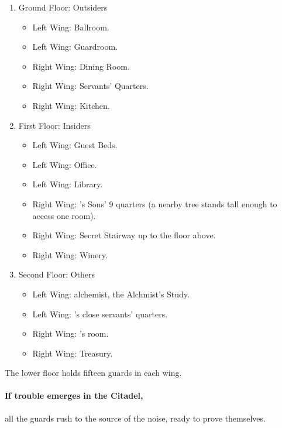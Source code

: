 \begin{enumerate}

  \item{Ground Floor: Outsiders}
    \begin{itemize}
      \item{Left Wing: Ballroom.}
      \item
      Left Wing: Guardroom.
      \item
      Right Wing: Dining Room.
      \item
      Right Wing: Servants' Quarters.
      \item
      Right Wing: Kitchen.
    \end{itemize}
  \item{First Floor: Insiders}
    \begin{itemize}
      \item
      Left Wing: Guest Beds.
      \item
      Left Wing: Office.
      \item
      Left Wing: Library.
      \item
      Right Wing: 's Sons' 9 quarters (a nearby tree stands tall enough to access one room).
      \item
      Right Wing: Secret Stairway up to the floor above.
      \item
      Right Wing: Winery.
    \end{itemize}

  \item
  Second Floor: Others
    \begin{itemize}
      \item
      Left Wing: \gls{alchemist}, the Alchmist's Study.
      \item
      Left Wing: 's close servants' quarters.
      \item
      Right Wing: 's room.
      \item
      Right Wing: Treasury.
    \end{itemize}

\end{enumerate}

The lower floor holds fifteen guards in each wing.


\paragraph{If trouble emerges in the Citadel,}
all the guards rush to the source of the noise, ready to prove themselves.

